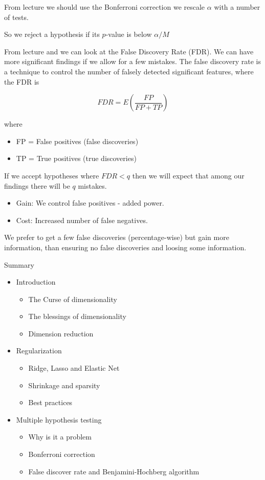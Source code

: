 From lecture \cite[p.60]{lecture3} we should use the Bonferroni correction we rescale $\alpha$ with a number of tests.

So we reject a hypothesis if its $p$-value is below $\alpha/M$

From lecture \cite[p.~61]{lecture3} and \cite[p.~687]{friedman2016elements} we can look at the False Discovery Rate (FDR). We can have more significant findings if we allow for a few mistakes. The false discovery rate is a technique to control the number of
falsely detected significant features, where the FDR is

\[
    FDR = E \left( \frac{FP}{FP + TP}\right)
\]

where 

\begin{itemize}
  \item FP = False positives (false discoveries)
  \item TP = True positives (true discoveries)
\end{itemize}

If we accept hypotheses where $FDR < q$ then we will expect that
among our findings there will be $q$ mistakes.

\begin{itemize}
  \item Gain: We control false positives - added power.
  \item Cost: Increased number of false negatives.
\end{itemize}

We prefer to get a few false discoveries (percentage-wise) but gain more information, than ensuring no false discoveries and loosing some information.

Summary

\begin{itemize}
  \item Introduction
  \begin{itemize}
    \item The Curse of dimensionality
    \item The blessings of dimensionality
    \item Dimension reduction
  \end{itemize}
  \item Regularization
  \begin{itemize}
    \item Ridge, Lasso and Elastic Net
    \item Shrinkage and sparsity
    \item Best practices
  \end{itemize}
  \item Multiple hypothesis testing
  \begin{itemize}
    \item Why is it a problem
    \item Bonferroni correction
    \item False discover rate and Benjamini-Hochberg algorithm
  \end{itemize}
\end{itemize} 
